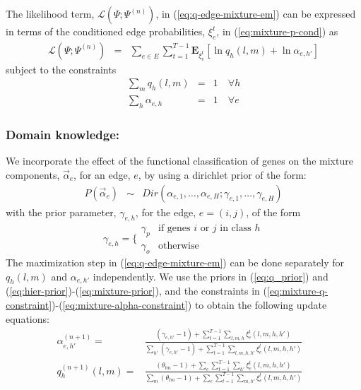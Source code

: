 \documentclass{bioinfo}
\begin{document}
\begin{methods}
\begin{equation}
\end{equation}
The likelihood term, $ {\mathcal L}(\Psi; \Psi^{(n)})$, in (\ref{eq:q-edge-mixture-em}) can be expressed
in terms of the conditioned edge probabilities, $\xi^t_e$, in
(\ref{eq:mixture-p-cond}) as 
\begin{eqnarray}
  \label{eq:mixture-L-edge}
  {\mathcal L}(\Psi; \Psi^{(n)}) &=& \sum_{e\in E}\sum_{t=1}^{T-1}
  \mathbf{E}_{\xi^t_e}[\ln q_h(l, m) + \ln \alpha_{e,h'}]
\end{eqnarray}
subject to the constraints
\begin{eqnarray}
  \label{eq:mixture-q-constraint} \sum_{m} q_h(l,m) &=& 1 \quad\forall h \\
   \label{eq:mixture-alpha-constraint} \sum_{h} \alpha_{e,h} &=& 1 \quad\forall e
\end{eqnarray}
\subsubsection{Domain knowledge:}
We incorporate the effect of the functional classification of
genes on the mixture components,
$\vec{\alpha}_e$, for an edge, $e$, by using a dirichlet prior of the form:
\begin{eqnarray}
  \label{eq:hier-prior}
  P(\vec{\alpha}_e) &\sim& Dir(\alpha_{e,1},\ldots, \alpha_{e,H};
  \gamma_{e,1},\ldots, \gamma_{e,H}) 
\end{eqnarray}
with the prior parameter, $\gamma_{e,h}$, for the edge, $e=(i,j)$, of the
form 
\begin{equation}
  \label{eq:mixture-prior}
  \gamma_{e,h} = \Big\{ \begin{array}{ll}
                       \gamma_p & \textrm{if genes }  i \textrm{ or } j
                       \textrm{ in class } h \\
                       \gamma_o & \textrm{otherwise}
                       \end{array}
\end{equation}
The maximization step in (\ref{eq:q-edge-mixture-em}) can  be done
separately for $q_h(l,m)$ and $\alpha_{e,h'}$ independently. We use
the priors in (\ref{eq:q_prior}) and
(\ref{eq:hier-prior})-(\ref{eq:mixture-prior}), and the constraints in
(\ref{eq:mixture-q-constraint})-(\ref{eq:mixture-alpha-constraint}) to
obtain the following update equations:%
\begin{eqnarray}
  \label{eq:mixture-alpha-update}
  \alpha_{e,h'}^{(n+1)} =&  \frac{(\gamma_{e,h'}-1) + \sum_{t=1}^{T-1} \sum_{l,m,h}\xi^{t}_{e}(l,
    m,h,h') }{\sum_{h'} (\gamma_{e,h'} -1) + \sum^{T-1}_{t=1}
    \sum_{l,m,h,h'} \xi^{t}_{e}(l,m,h,h')} & \\
\label{eq:mixture-q-update} 
q^{(n+1)}_h(l,m) =&  \frac{(\theta_{lm}-1) + \sum_e \sum_{t=1}^{T-1}\sum_{h'}\xi^{t}_{e}(l,
    m,h,h') }{\sum_{m} (\theta_{lm} -1) + \sum_e \sum^{T-1}_{t=1}
    \sum_{m,h'} \xi^{t}_{e}(l,m,h,h')} &
\end{eqnarray}


\end{methods}
\end{document}

